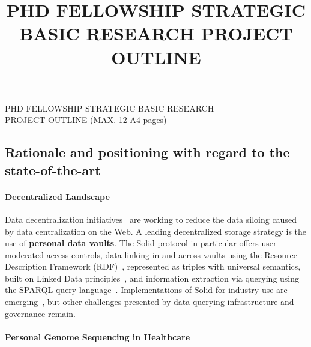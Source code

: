 \documentclass[a4paper,11pt]{article}
\begin{document}
\begin{mdframed}[backgroundcolor=black!17,linecolor=black!0,font=\bfseries]
	\centering
	PHD FELLOWSHIP STRATEGIC BASIC RESEARCH\\
	PROJECT OUTLINE (MAX. 12 A4 pages)\\
	\end{mdframed}
	\vspace{-.5\baselineskip}
\title{PHD FELLOWSHIP STRATEGIC BASIC RESEARCH PROJECT OUTLINE}

\begin{refsection}

\section{Rationale and positioning with regard to the state-of-the-art}

\smallskip

\paragraph{Decentralized Landscape}
Data decentralization initiatives~\cite{solid, mastodon, decentralizednanopubs} are working to reduce the data siloing caused by data centralization on the Web.
A leading decentralized storage strategy is the use of \textbf{personal data vaults}.
The Solid protocol in particular offers user-moderated access controls, data linking in and across vaults using the Resource Description Framework (RDF)~\cite{spec:rdf}, represented as triples with universal semantics, built on Linked Data principles~\cite{linkeddata}, and information extraction via querying using the SPARQL query language~\cite{spec:sparqllang}.
Implementations of Solid for industry use are emerging~\cite{athumi}, but other challenges presented by data querying infrastructure and governance remain.


\paragraph{Personal Genome Sequencing in Healthcare}


\end{refsection}
\end{document}
